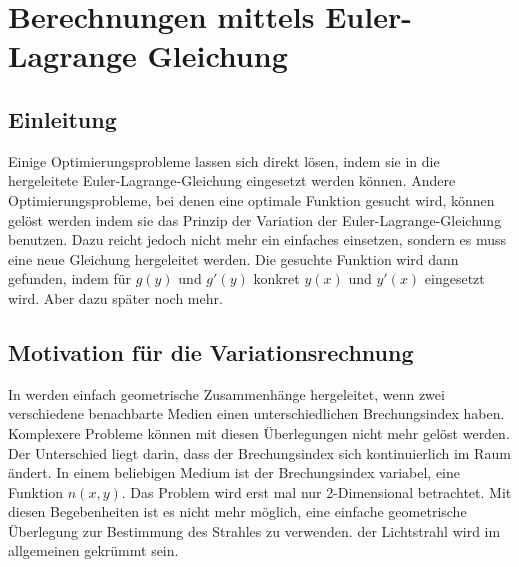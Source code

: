\section{Berechnungen mittels Euler-Lagrange Gleichung}
\subsection{Einleitung}
Einige Optimierungsprobleme lassen sich direkt lösen, indem sie in die hergeleitete Euler-Lagrange-Gleichung eingesetzt werden können. Andere Optimierungsprobleme, bei denen eine optimale Funktion gesucht wird, können gelöst werden indem sie das Prinzip der Variation der Euler-Lagrange-Gleichung benutzen. Dazu reicht jedoch nicht mehr ein einfaches einsetzen, sondern es muss eine neue Gleichung hergeleitet werden. Die gesuchte Funktion wird dann gefunden, indem für $g(y)$ und $g'(y)$ konkret $y(x)$ und $y'(x)$ eingesetzt wird. Aber dazu später noch mehr.
\subsection{Motivation für die Variationsrechnung}
In  werden einfach geometrische Zusammenhänge hergeleitet, wenn zwei verschiedene benachbarte Medien einen unterschiedlichen Brechungsindex haben. Komplexere Probleme können mit diesen Überlegungen nicht mehr gelöst werden. Der Unterschied liegt darin, dass der Brechungsindex sich kontinuierlich im Raum ändert. In   einem  beliebigen  Medium  ist  der Brechungsindex variabel, eine Funktion $n(x,y)$. Das  Problem wird erst mal nur 2-Dimensional betrachtet. Mit diesen Begebenheiten ist es nicht mehr möglich, eine einfache geometrische Überlegung  zur  Bestimmung  des  Strahles  zu verwenden. der Lichtstrahl wird im allgemeinen gekrümmt sein.
